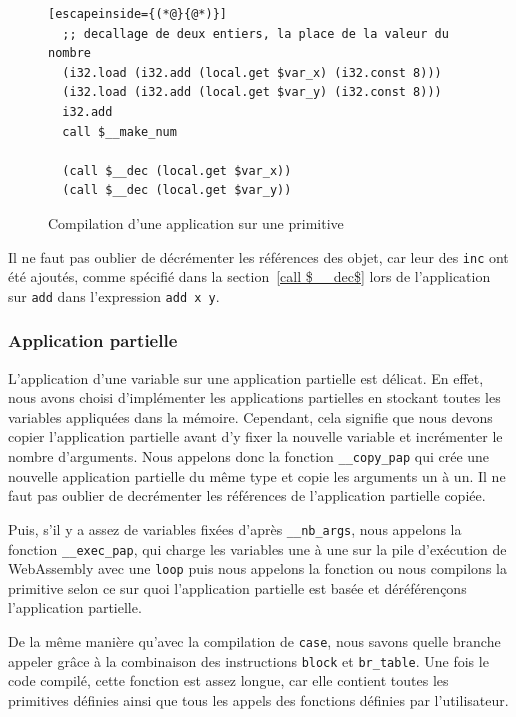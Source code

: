\documentclass{rapportECL}
\begin{document}
\begin{figure}[H]
	\begin{lstlisting}[escapeinside={(*@}{@*)}]
  ;; decallage de deux entiers, la place de la valeur du nombre
  (i32.load (i32.add (local.get $var_x) (i32.const 8)))
  (i32.load (i32.add (local.get $var_y) (i32.const 8)))
  i32.add
  call $__make_num
  
  (call $__dec (local.get $var_x))
  (call $__dec (local.get $var_y))
	\end{lstlisting}
	\caption{Compilation d'une application sur une primitive}
	\label{listing:compile_add}
\end{figure}

Il ne faut pas oublier de décrémenter les références des objet, car leur des \verb|inc| ont été ajoutés, comme spécifié dans la 
section~\ref{call $__dec$} lors de l'application sur \verb|add| dans l'expression \verb|add x y|.

\subsubsection{Application partielle}

L'application d'une variable sur une application partielle est délicat. En effet, nous avons choisi d'implémenter les applications partielles en stockant toutes les variables appliquées dans la mémoire. Cependant, cela signifie que nous devons copier l'application partielle avant d'y fixer la nouvelle variable et incrémenter le nombre d'arguments. Nous appelons donc la fonction \verb|__copy_pap| qui crée une nouvelle application partielle du même type et copie les arguments un à un. Il ne faut pas oublier de decrémenter les références de l'application partielle copiée.

Puis, s'il y a assez de variables fixées d'après \verb|__nb_args|, nous appelons la fonction \verb|__exec_pap|, qui charge les variables une à une sur la pile d'exécution de WebAssembly avec une \verb|loop| puis nous appelons la fonction ou nous compilons la primitive selon ce sur quoi l'application partielle est basée et déréférençons l'application partielle.

De la même manière qu'avec la compilation de \verb|case|, nous savons quelle branche appeler grâce à la combinaison des instructions \verb|block| et \verb|br_table|. Une fois le code compilé, cette fonction est assez longue, car elle contient toutes les primitives définies ainsi que tous les appels des fonctions définies par l'utilisateur.
\end{document}
